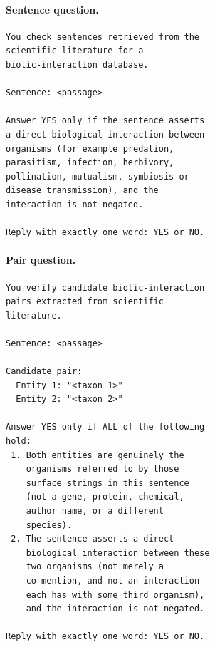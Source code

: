 \documentclass[11pt]{article}
\begin{document}
\paragraph{Sentence question.}
\begin{footnotesize}
\begin{verbatim}
You check sentences retrieved from the
scientific literature for a
biotic-interaction database.

Sentence: <passage>

Answer YES only if the sentence asserts
a direct biological interaction between
organisms (for example predation,
parasitism, infection, herbivory,
pollination, mutualism, symbiosis or
disease transmission), and the
interaction is not negated.

Reply with exactly one word: YES or NO.
\end{verbatim}
\end{footnotesize}

\paragraph{Pair question.}
\begin{footnotesize}
\begin{verbatim}
You verify candidate biotic-interaction
pairs extracted from scientific
literature.

Sentence: <passage>

Candidate pair:
  Entity 1: "<taxon 1>"
  Entity 2: "<taxon 2>"

Answer YES only if ALL of the following
hold:
 1. Both entities are genuinely the
    organisms referred to by those
    surface strings in this sentence
    (not a gene, protein, chemical,
    author name, or a different
    species).
 2. The sentence asserts a direct
    biological interaction between these
    two organisms (not merely a
    co-mention, and not an interaction
    each has with some third organism),
    and the interaction is not negated.

Reply with exactly one word: YES or NO.
\end{verbatim}
\end{footnotesize}
\end{document}
